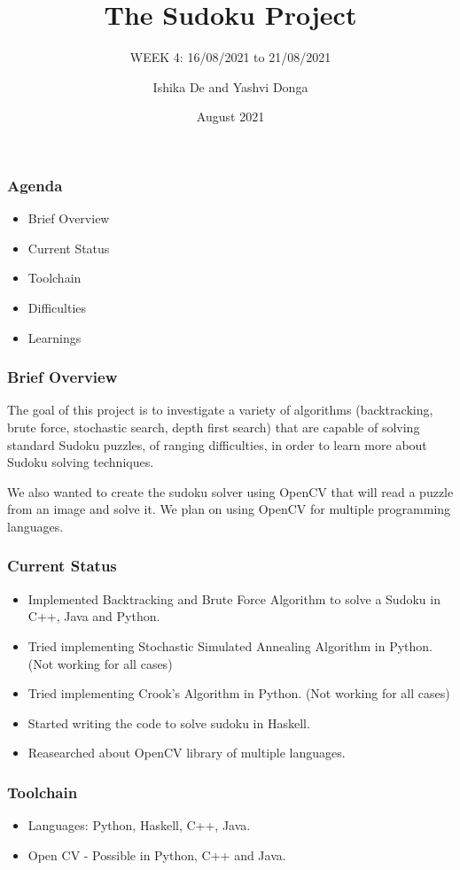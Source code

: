 \documentclass{beamer}
\title{The Sudoku Project}
\subtitle{WEEK 4: 16/08/2021 to 21/08/2021}
\author[Ishika | Yashvi]{Ishika De and Yashvi Donga}
\date{August 2021}
\begin{document}
\begin{frame}
     \titlepage
\end{frame}
\begin{frame}
     \frametitle{Agenda}
     \begin{itemize}
          \item Brief Overview
          \item Current Status
          \item Toolchain
          \item Difficulties
          \item Learnings
     \end{itemize}
\end{frame}

\begin{frame}
     \frametitle{Brief Overview}
     The goal of this project is to investigate a variety of algorithms (backtracking, brute force, stochastic search, depth first search) that are capable of solving
standard Sudoku puzzles, of ranging difficulties, in order to learn more about Sudoku
solving techniques.\newline

     We also wanted to create the sudoku solver using OpenCV that will read a puzzle from an image and solve it. We plan on using OpenCV for multiple programming languages.
\end{frame}

\begin{frame}
     \frametitle{Current Status}   
     \begin{itemize}
		  \item Implemented Backtracking and Brute Force Algorithm to solve a Sudoku in C++, Java and Python.
		  \item Tried implementing Stochastic Simulated Annealing Algorithm in Python. (Not working for all cases) 
		  \item Tried implementing Crook's Algorithm in Python. (Not working for all cases)
		  \item Started writing the code to solve sudoku in Haskell. 
		  \item Reasearched about OpenCV library of multiple languages.
	 \end{itemize}
\end{frame}


\begin{frame}
     \frametitle{Toolchain}
     \begin{itemize}
          \item Languages: Python, Haskell, C++, Java.
          \item Open CV - Possible in Python, C++ and Java.
     \end{itemize}
\end{frame}
\end{document}
